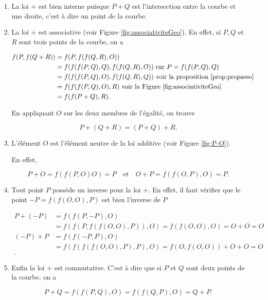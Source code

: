 \begin{demonstration}
    \begin{enumerate}
        \item La loi $+$ est bien interne puisque $P + Q$ est l'intersection entre la courbe et
            une droite, c'est à dire un point de la courbe.

        \item La loi $+$ est associative (voir Figure \ref{fig:associativiteGeo}). En effet, si $P,Q$ et $R$ sont trois
            points de la courbe, on a

            \begin{align*}
            f(P,f(Q+R)) &= f(P,f(f(Q,R),O)) \\
            &= f(f(f(P,Q),Q),f(f(Q,R),O)) \text{ car } P = f(f(P,Q),Q) \\
            &= f(f(f(P,Q),O),f(f(Q,R),Q)) \text{ voir la proposition
            \ref{prop:propasso} } \\
            &= f(f(f(P,Q),O),R) \text{ voir la Figure \ref{fig:associativiteGeo}} \\
            &= f(f(P+Q),R)
            .\end{align*}

            En appliquant $O$ sur les deux membres de l'égalité, on trouve

            \[
            P + (Q+R) = (P+Q) + R
            .\] 

        \item L'élément $O$ est l'élément neutre de la loi additive (voir Figure
            \ref{fig:P-O}). 

            En effet,

            \[
            P + O = f(f(P,O)O) = P \quad \text{et} \quad O+P =
            f(f(O,P),O) = P
            .\] 

        \item Tout point $P$ possède un inverse pour la loi $+$. En effet, il faut vérifier que
            le point $-P= f(f(O,O),P)$ est bien l'inverse de $P$ 

            \begin{align*}
                P + (-P) &= f(f(P,-P),O) \\
                &= f(f(P,f(f(O,O),P)),O) =
                f(f(O,O),O) =
                O+O=O  \\
                (-P) + P &= f(f(-P,P),O) \\
                &= f(f(f(f(O,O),P),P),O) =
                f(O,f(O,O)) + O+O=
                O \\
            .\end{align*}

        \item Enfin la loi $+$ est commutative. C'est à dire que si $P$ et $Q$ sont deux
            points de la courbe, on a

            \[
            P + Q = f(f(P,Q),O) = f(f(Q,P),O) = Q + P
            .\] 
    \end{enumerate}    
\end{demonstration}

